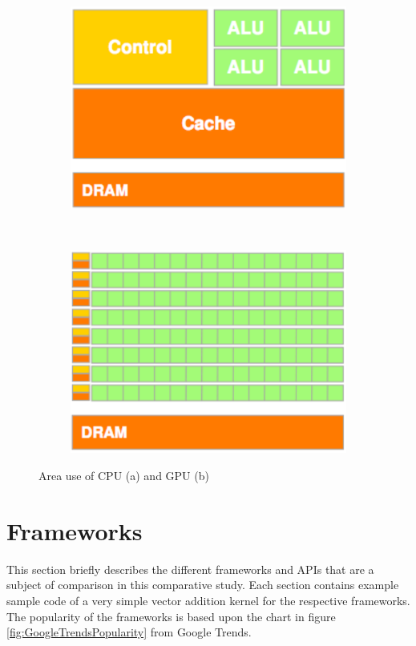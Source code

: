 \begin{figure}[!h]
    \centering
    \begin{subfigure}[b]{0.4\textwidth}
        \includegraphics[width=\textwidth]{Theory/Figs/CPUArch.png}
        \caption{}
    \end{subfigure}
    ~ 
    \begin{subfigure}[b]{0.4\textwidth}
        \includegraphics[width=\textwidth]{Theory/Figs/GPUArch.png}
        \caption{}
    \end{subfigure}
    \caption{Area use of CPU (a) and GPU (b)}
    \label{fig:GPUvsCPUArchitecture}
\end{figure}



\section{Frameworks}
This section briefly describes the different frameworks and APIs that are a subject of comparison in this comparative study. Each section contains example sample code of a very simple vector addition kernel for the respective frameworks. The popularity of the frameworks is based upon the chart in figure \ref{fig:GoogleTrendsPopularity} from Google Trends.

